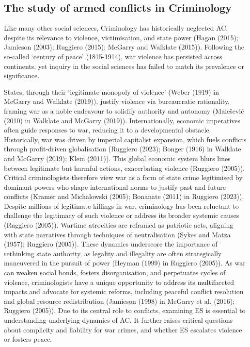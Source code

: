 \documentclass[
]{article}
\begin{document}
\subsection{The study of armed conflicts in
Criminology}\label{the-study-of-armed-conflicts-in-criminology}

Like many other social sciences, Criminology has historically neglected
AC, despite its relevance to violence, victimisation, and state power
(Hagan (2015); Jamieson (2003); Ruggiero (2015); McGarry and Walklate
(2015)). Following the so-called `century of peace' (1815-1914), war
violence has persisted across continents, yet inquiry in the social
sciences has failed to match its prevalence or significance.

States, through their `legitimate monopoly of violence' (Weber (1919) in
McGarry and Walklate (2019)), justify violence via bureaucratic
rationality, framing war as a noble endeavour to solidify authority and
autonomy (Malešević (2010) in Walklate and McGarry (2019)).
Internationally, economic imperatives often guide responses to war,
reducing it to a developmental obstacle. Historically, war was driven by
imperial capitalist expansion, which fuels conflicts through
profit-driven globalisation (Ruggiero (2023); Bonger (1916) in Walklate
and McGarry (2019); Klein (2011)). This global economic system blurs
lines between legitimate but harmful actions, exacerbating violence
(Ruggiero (2005)). Critical criminologists therefore view war as a form
of state crime legitimised by dominant powers who shape international
norms to justify past and future conflicts (Kramer and Michalowski
(2005); Bonanate (2011) in Ruggiero (2023)). Despite millions of
legitimate killings in war, criminology has been reluctant to challenge
the legitimacy of such violence or address its broader systemic causes
(Ruggiero (2005)). Wartime atrocities are reframed as patriotic acts,
aligning with state narratives through techniques of neutralisation
(Sykes and Matza (1957); Ruggiero (2005)). These dynamics underscore the
importance of rethinking state authority, as legality and illegality are
often strategically maneuvered in the pursuit of power (Heyman (1999) in
Ruggiero (2005)). As war can weaken social bonds, fosters
disorganisation, and perpetuates cycles of violence, criminologists have
a unique opportunity to address its multifaceted impacts and advocate
for systemic reforms, including peaceful conflict resolution and global
resource redistribution (Jamieson (1998) in McGarry et al. (2016);
Ruggiero (2005)). Due to its central role to conflicts, examining ES is
essential to understanding underlying dynamics of AC. It further raises
critical questions about complicity and liability for war crimes, and
whether ES escalates violence or fosters peace.
\end{document}
